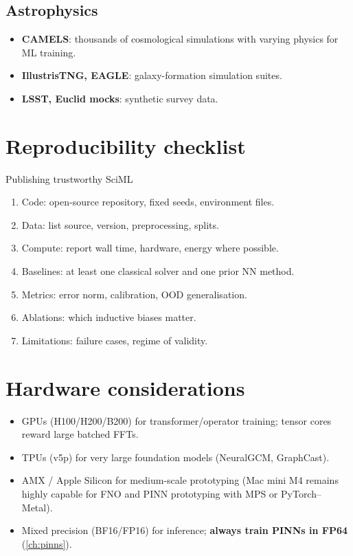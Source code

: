 \subsection{Astrophysics}
\begin{itemize}
\item \textbf{CAMELS}: thousands of cosmological simulations with
varying physics for ML training.
\item \textbf{IllustrisTNG, EAGLE}: galaxy-formation simulation suites.
\item \textbf{LSST, Euclid mocks}: synthetic survey data.
\end{itemize}

\section{Reproducibility checklist}
\begin{recipe}{Publishing trustworthy SciML}
\begin{enumerate}
\item Code: open-source repository, fixed seeds, environment files.
\item Data: list source, version, preprocessing, splits.
\item Compute: report wall time, hardware, energy where possible.
\item Baselines: at least one classical solver and one prior NN method.
\item Metrics: error norm, calibration, OOD generalisation.
\item Ablations: which inductive biases matter.
\item Limitations: failure cases, regime of validity.
\end{enumerate}
\end{recipe}

\section{Hardware considerations}
\begin{itemize}
\item GPUs (H100/H200/B200) for transformer/operator training; tensor
cores reward large batched FFTs.
\item TPUs (v5p) for very large foundation models (NeuralGCM,
GraphCast).
\item AMX / Apple Silicon for medium-scale prototyping (Mac mini M4
remains highly capable for FNO and PINN prototyping with MPS or
PyTorch--Metal).
\item Mixed precision (BF16/FP16) for inference; \textbf{always train
PINNs in FP64} (\cref{ch:pinns}).
\end{itemize}
